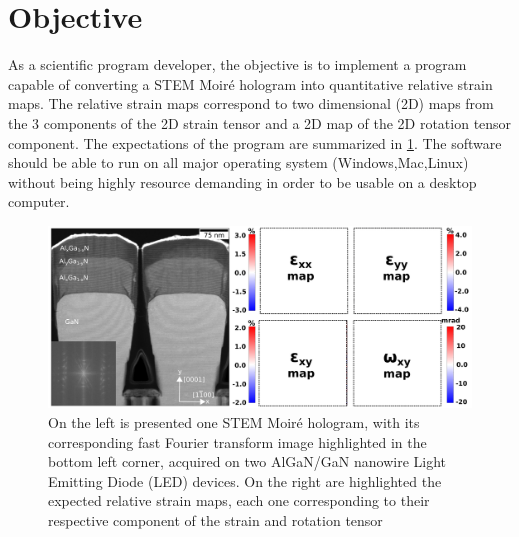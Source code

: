 \documentclass{article}
\begin{document}
\section{Objective}
As a scientific program developer, the objective is to implement a program capable of converting a STEM Moir{\'e} hologram into quantitative relative strain maps. The relative strain maps correspond to two dimensional (2D) maps from the 3 components of the 2D strain tensor and a 2D map of the 2D rotation tensor component. The expectations of the program are summarized in \cref{fig:STEM_Moire_GPA_Objective}. The software should be able to run on all major operating system (Windows,Mac,Linux) without being highly resource demanding in order to be usable on a desktop computer.
\begin{figure}[H]
	\centering
	\includegraphics[width=\linewidth]{Figures/STEM_Moire_GPA_objective.png}
	\caption[STEM Moir{\'e} GPA objective]{On the left is presented one STEM Moir{\'e} hologram, with its corresponding fast Fourier transform image highlighted in the bottom left corner, acquired on two AlGaN/GaN nanowire Light Emitting Diode (LED) devices. On the right are highlighted the expected relative strain maps, each one corresponding to their respective component of the strain and rotation tensor}
	\label{fig:STEM_Moire_GPA_Objective}
\end{figure}
\end{document}
